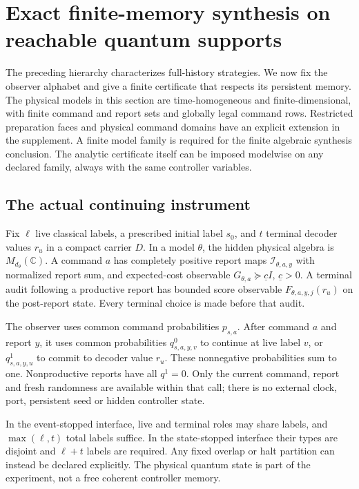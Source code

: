 \section{Exact finite-memory synthesis on reachable quantum supports}\label{sec:finite-memory}
The preceding hierarchy characterizes full-history strategies. We now fix the observer alphabet and give a finite certificate that respects its persistent memory. The physical models in this section are time-homogeneous and finite-dimensional, with finite command and report sets and globally legal command rows. Restricted preparation faces and physical command domains have an explicit extension in the supplement. A finite model family is required for the finite algebraic synthesis conclusion. The analytic certificate itself can be imposed modelwise on any declared family, always with the same controller variables.

\subsection{The actual continuing instrument}
Fix $\ell$ live classical labels, a prescribed initial label $s_0$, and $t$ terminal decoder values $r_u$ in a compact carrier $D$. In a model $\theta$, the hidden physical algebra is $M_{d_\theta}(\mathbb C)$. A command $a$ has completely positive report maps $\mathcal I_{\theta,a,y}$ with normalized report sum, and expected-cost observable $G_{\theta,a}\succeq\underline c I$, $\underline c>0$. A terminal audit following a productive report has bounded score observable $F_{\theta,a,y,j}(r_u)$ on the post-report state. Every terminal choice is made before that audit.

The observer uses common command probabilities $p_{s,a}$. After command $a$ and report $y$, it uses common probabilities $q^0_{s,a,y,v}$ to continue at live label $v$, or $q^1_{s,a,y,u}$ to commit to decoder value $r_u$. These nonnegative probabilities sum to one. Nonproductive reports have all $q^1=0$. Only the current command, report and fresh randomness are available within that call; there is no external clock, port, persistent seed or hidden controller state.

In the event-stopped interface, live and terminal roles may share labels, and $\max(\ell,t)$ total labels suffice. In the state-stopped interface their types are disjoint and $\ell+t$ labels are required. Any fixed overlap or halt partition can instead be declared explicitly. The physical quantum state is part of the experiment, not a free coherent controller memory.

